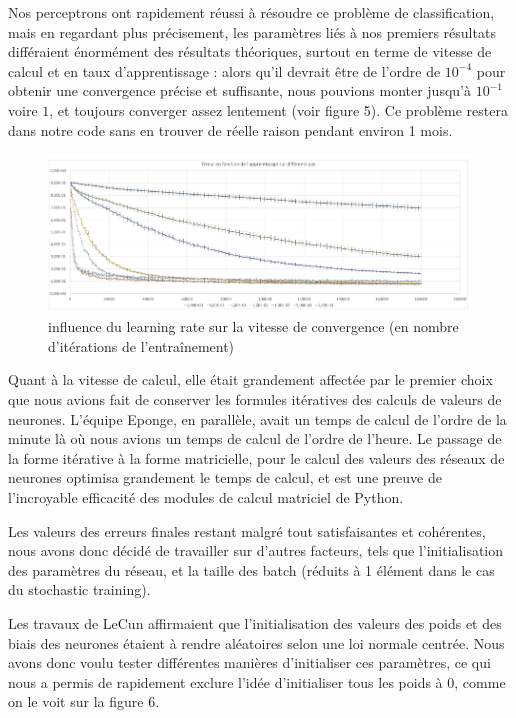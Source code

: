 \documentclass[
    10pt,
    a4paper,
    oneside,
    headinclude,footinclude,
    BCOR=5mm,
    captions=tableabove
]{scrartcl}
\begin{document}
Nos perceptrons ont rapidement réussi à résoudre ce problème de classification, mais en regardant plus précisement, les paramètres liés à nos premiers résultats différaient énormément des résultats théoriques, surtout en terme de vitesse de calcul et en taux d'apprentissage : alors qu'il devrait être de l'ordre de $10^{-4}$ pour obtenir une convergence précise et suffisante, nous pouvions monter jusqu'à $10^{-1}$ voire $1$, et toujours converger assez lentement (voir figure 5). Ce problème restera dans notre code sans en trouver de réelle raison pendant environ 1 mois.

\begin{figure}[h!]
\includegraphics[width=\linewidth]{errorRate.png}
\centering
 \caption{influence du learning rate sur la vitesse de convergence (en nombre d'itérations de l'entraînement) }
 \label{fig:errorRate.png}
\end{figure}

Quant à la vitesse de calcul, elle était grandement affectée par le premier choix que nous avions fait de conserver les formules itératives des calculs de valeurs de neurones. L'équipe Eponge, en parallèle, avait un temps de calcul de l'ordre de la minute là où nous avions un temps de calcul de l'ordre de l'heure. Le passage de la forme itérative à la forme matricielle, pour le calcul des valeurs des réseaux de neurones optimisa grandement le temps de calcul, et est une preuve de l'incroyable efficacité des modules de calcul matriciel de Python. 

\vspace{5mm}
Les valeurs des erreurs finales restant malgré tout satisfaisantes et cohérentes, nous avons donc décidé de travailler sur d'autres facteurs, tels que l'initialisation des paramètres du réseau, et la taille des batch (réduits à 1 élément dans le cas du stochastic training).

Les travaux de LeCun affirmaient que l'initialisation des valeurs des poids et des biais des neurones étaient à rendre aléatoires selon une loi normale centrée. Nous avons donc voulu tester différentes manières d'initialiser ces paramètres, ce qui nous a permis de rapidement exclure l'idée d'initialiser tous les poids à $0$, comme on le voit sur la figure 6. 
\end{document}
